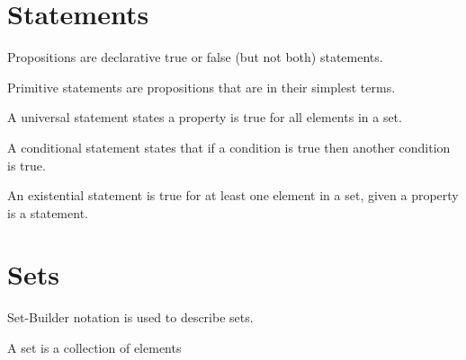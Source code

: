\documentclass{article}
\begin{document}

\tableofcontents

\section{Statements}

\begin{definition}[Propositions]\label{def:props}
Propositions are declarative true or false (but not both) statements.
\end{definition}

\begin{definition}\label{def:prims}
Primitive statements are propositions that are in their simplest terms.
\end{definition}

\begin{definition}\label{def:universal-stmts}
A universal statement states a property is true for all elements in a set.
\end{definition}

\begin{definition}\label{def:cond-stmts}
A conditional statement states that if a condition is true then another condition is true.
\end{definition}

\begin{definition}\label{def:exist-stmts}
An existential statement is true for at least one element in a set, given a property is a statement.
\end{definition}

\section{Sets}

Set-Builder notation is used to describe sets.

\begin{definition}\label{def:set}
A set is a collection of elements
\end{definition}
\end{document}
